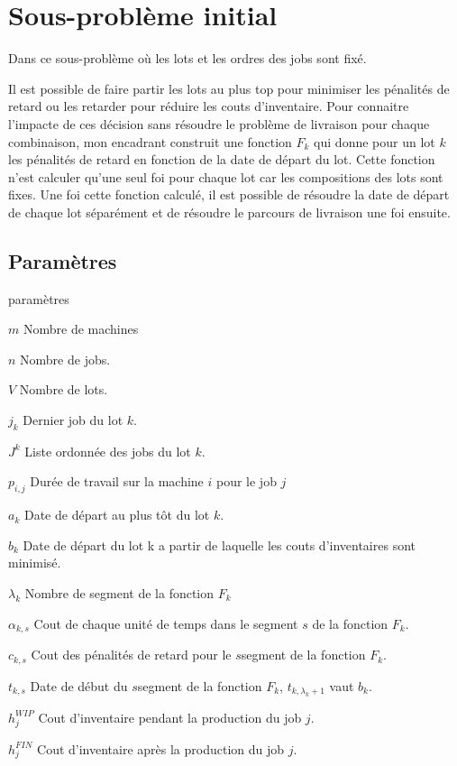 \chapter{Sous-problème initial}

\label{appendix:modelisation_initiale}

Dans ce sous-problème où les lots et les ordres des jobs sont fixé.

Il est possible de faire partir les lots au plus top pour minimiser les pénalités de retard ou les retarder pour réduire les couts d'inventaire.
Pour connaitre l'impacte de ces décision sans résoudre le problème de livraison pour chaque combinaison,
mon encadrant construit une fonction $F_k$ qui donne pour un lot $k$ les pénalités de retard en fonction de la date de départ du lot.
Cette fonction n'est calculer qu'une seul foi pour chaque lot car les compositions des lots sont fixes.
Une foi cette fonction calculé, il est possible de résoudre la date de départ de chaque lot séparément et de résoudre le parcours de livraison une foi ensuite.

\section{Paramètres}
\begin{labeling}{paramètres}
	\item [$m$]
	Nombre de machines
	\item [$n$]
	Nombre de jobs.
	\item [$V$]
	Nombre de lots.
	\item [$j_k$]
	Dernier job du lot $k$.
	\item [$J^k$] 
	Liste ordonnée des jobs du lot $k$.
	\item [$p_{i, j}$]
	Durée de travail sur la machine $i$ pour le job $j$
	\item [$a_k$]
	Date de départ au plus tôt du lot $k$.
	\item [$b_k$]
	Date de départ du lot k a partir de laquelle les couts d'inventaires sont minimisé.
	\item [$\lambda_k$]
	Nombre de segment de la fonction $F_k$
	\item [$\alpha_{k, s}$]
	Cout de chaque unité de temps dans le segment $s$ de la fonction $F_k$.
	\item [$c_{k, s}$]
	Cout des pénalités de retard pour le $s$\ieme segment de la fonction $F_k$.
	\item [$t_{k, s}$]
	Date de début du $s$\ieme segment de la fonction $F_k$, $t_{k, \lambda_k+1}$ vaut $b_k$.
	\item [$h_{j}^{WIP}$] 
	Cout d'inventaire pendant la production du job $j$.
	\item [$h_{j}^{FIN}$] 
	Cout d'inventaire après la production du job $j$.
\end{labeling}


